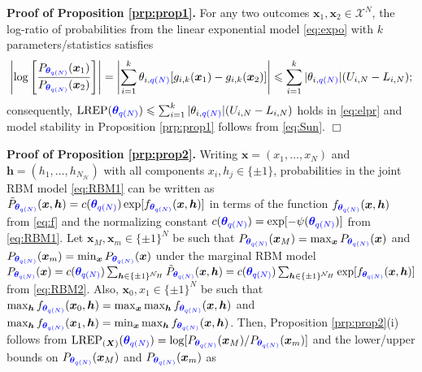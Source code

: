 \documentclass[numbib]{imamat}
\theoremstyle{theorem}
\theoremstyle{lemma}
\theoremstyle{example}
\theoremstyle{corollary}
\theoremstyle{definition}
\theoremstyle{remark}
\theoremstyle{approximation}
\theoremstyle{scheme}
\newcommand{\REP}{\mathrm{LREP}}
\newcommand{\thetaidx}{q(N)}
\newcommand{\thetaN}{\boldsymbol \theta_{\thetaidx}}
\newcommand{\ak}[1]{{\color{blue} #1}}
\begin{document}
\textbf{Proof of Proposition \ref{prp:prop1}.} For any two outcomes \(\boldsymbol x_1, \boldsymbol x_2\in\mathcal{X}^N\), the log-ratio of probabilities from the linear exponential model \eqref{eq:expo} with \(k\) parameters/statistics satisfies
\[
\left|\log \left[ \frac{P_{\ak{\thetaN}}(\boldsymbol x_1)}{P_{\ak{\thetaN}}(\boldsymbol x_2)}  \right] \right| =
\left|  \sum_{i=1}^k \theta_{i,\ak{\thetaidx}} [g_{i,k}(\boldsymbol x_1) - g_{i,k}(\boldsymbol x_2) ] \right|  \leq  \sum_{i=1}^k | \theta_{i,\ak{\thetaidx}}| (U_{i,N}-L_{i,N});
\]
consequently, \(\REP(\ak{\thetaN} ) \leq \sum_{i=1}^k | \theta_{i,\ak{\thetaidx}}| (U_{i,N}-L_{i,N})\) holds in \eqref{eq:elpr} and model stability in Proposition \ref{prp:prop1} follows from \eqref{eq:Sun}. \hfill \(\Box\)

\textbf{Proof of Proposition \ref{prp:prop2}.}
Writing \(\boldsymbol x=(x_1,\ldots,x_N)\) and \(\boldsymbol h = (h_1,\ldots,h_{N_{\mathcal{H}}})\) with all components \(x_i,h_j\in\{\pm 1\}\), probabilities in the joint RBM model \eqref{eq:RBM1} can be written as \(\tilde{P}_{\ak{\thetaN}} (\boldsymbol x, \boldsymbol h) = c(\ak{\thetaN})\exp[ f_{\ak{\thetaN}} (\boldsymbol x, \boldsymbol h)]\) in terms of the function \(f_{\ak{\thetaN}} (\boldsymbol x, \boldsymbol h)\) from \eqref{eq:f} and the normalizing constant \(c(\ak{\thetaN})= \exp [-\psi(\ak{\thetaN})]\) from \eqref{eq:RBM1}. Let \(\boldsymbol x_M, \boldsymbol x_m\in\{\pm 1\}^N\) be such that \(P_{\ak{\thetaN}} (\boldsymbol x_M) = \max_{\boldsymbol x}P_{\ak{\thetaN}} (\boldsymbol x)\) and \(P_{\ak{\thetaN}} (\boldsymbol x_m) = \min_{\boldsymbol x}P_{\ak{\thetaN}} (\boldsymbol x)\) under the marginal RBM model \(P_{\ak{\thetaN}} (\boldsymbol x) = c(\ak{\thetaN})\sum_{\boldsymbol h \in\{\pm 1\}^{\mathcal{N}_H}} \tilde{P}_{\ak{\thetaN}} (\boldsymbol x, \boldsymbol h)= c( \ak{\thetaN})\sum_{\boldsymbol h \in\{\pm 1\}^{\mathcal{N}_H}} \exp[ f_{\ak{\thetaN}} (\boldsymbol x, \boldsymbol h)]\) from \eqref{eq:RBM2}. Also, \(\boldsymbol x_0,x_1\in\{\pm 1\}^N\) be such that \(\max_{\boldsymbol h}f_{\ak{\thetaN}} (\boldsymbol x_0, \boldsymbol h)=\max_{\boldsymbol x}\max_{\boldsymbol h}f_{\ak{\thetaN}} (\boldsymbol x , \boldsymbol h)\) and \(\max_{\boldsymbol h}f_{\ak{\thetaN}} (\boldsymbol x_1, \boldsymbol h)=\min_{\boldsymbol x}\max_{\boldsymbol h}f_{\ak{\thetaN}} (\boldsymbol x , \boldsymbol h)\). Then, Proposition \ref{prp:prop2}(i) follows from \(\REP_{(\boldsymbol X)}(\ak{\thetaN}) = \log[P_{\ak{\thetaN}} (\boldsymbol x_M) /P_{\ak{\thetaN}} (\boldsymbol x_m) ]\) and the lower/upper bounds on \(P_{\ak{\thetaN}} (\boldsymbol x_M)\) and \(P_{\ak{\thetaN}} (\boldsymbol x_m)\) as
\end{document}
